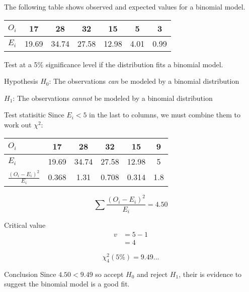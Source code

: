             \begin{example}
            {
                The following table shows observed and expected values for a binomial model.

                \begin{center}
                \begin{tabular}{l|c|c|c|c|c|c}
                $O_i$ & 17 & 28 & 32 & 15 & 5 & 3 \\
                \hline
                $E_i$ & 19.69 & 34.74 & 27.58 & 12.98 & 4.01 & 0.99 \\
                \end{tabular}
                \end{center}

                Test at a 5\% significance level if the distribution fits a binomial model.
            }

            \begin{step}{Hypothesis}
            $H_0$: The observations \textit{can} be modeled by a binomial distribution

            $H_1$: The observations \textit{cannot} be modeled by a binomial distribution
            \end{step}

            \begin{step}{Test statisitic}
                Since $E_i < 5$ in the last to columns, we must combine them to work out $\chi^2$:

                \begin{center}
                \begin{tabular}{l|c|c|c|c|c}
                $O_i$ & 17 & 28 & 32 & 15 & 9 \\
                \hline
                $E_i$ & 19.69 & 34.74 & 27.58 & 12.98 & 5 \\
                $\displaystyle\frac{(O_i - E_i)^2}{E_i}$ & 0.368 & 1.31 & 0.708 & 0.314 & 1.8 \\
                \end{tabular}
                \end{center}

                $$
                \sum{\frac{(O_i - E_i)^2}{E_i}} = 4.50
                $$
            \end{step}

            \begin{step}{Critical value}
                \begin{align*}
                v &= 5 - 1 \\
                   &= 4
                \end{align*}

                $$
                \chi^2_4(5\%) = 9.49...
                $$
            \end{step}

            \begin{step}{Conclusion}
                Since $4.50 < 9.49$ so accept $H_0$ and reject $H_1$, their is evidence to suggest the binomial model is a good fit.
            \end{step}

        \end{example}

